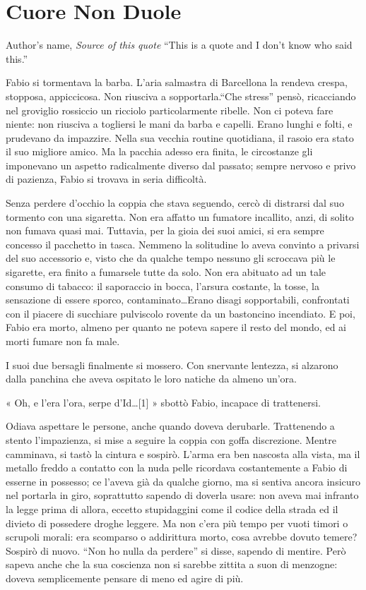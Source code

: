 \chapter{Cuore Non Duole}

\begin{chapquote}{Author's name, \textit{Source of this quote}}
``This is a quote and I don't know who said this.''
\end{chapquote}

Fabio si tormentava la barba. L'aria salmastra di Barcellona la rendeva crespa, stopposa, appiccicosa. Non riusciva a sopportarla.``Che stress'' pensò, ricacciando nel groviglio rossiccio un ricciolo particolarmente ribelle. Non ci poteva fare niente: non riusciva a togliersi le mani da barba e capelli. Erano lunghi e folti, e prudevano da impazzire. Nella sua vecchia routine quotidiana, il rasoio era stato il suo migliore amico. Ma la pacchia adesso era finita, le circostanze gli imponevano un aspetto radicalmente diverso dal passato; sempre nervoso e privo di pazienza, Fabio si trovava in seria difficoltà.

Senza perdere d'occhio la coppia che stava seguendo, cercò di distrarsi dal suo tormento con una sigaretta. Non era affatto un fumatore incallito, anzi, di solito non fumava quasi mai. Tuttavia, per la gioia dei suoi amici, si era sempre concesso il pacchetto in tasca. Nemmeno la solitudine lo aveva convinto a privarsi del suo accessorio e, visto che da qualche tempo nessuno gli scroccava più le sigarette, era finito a fumarsele tutte da solo. Non era abituato ad un tale consumo di tabacco: il saporaccio in bocca, l'arsura costante, la tosse, la sensazione di essere sporco, contaminato\ldots Erano disagi sopportabili, confrontati con il piacere di succhiare pulviscolo rovente da un bastoncino incendiato. E poi, Fabio era morto, almeno per quanto ne poteva sapere il resto del mondo, ed ai morti fumare non fa male.

I suoi due bersagli finalmente si mossero. Con snervante lentezza, si alzarono dalla panchina che aveva ospitato le loro natiche da almeno un'ora.

« Oh, e l'era l'ora, serpe d'Id\ldots [1] » sbottò Fabio, incapace di trattenersi.

Odiava aspettare le persone, anche quando doveva derubarle. Trattenendo a stento l'impazienza, si mise a seguire la coppia con goffa discrezione. Mentre camminava, si tastò la cintura e sospirò. L'arma era ben nascosta alla vista, ma il metallo freddo a contatto con la nuda pelle ricordava costantemente a Fabio di esserne in possesso; ce l'aveva già da qualche giorno, ma si sentiva ancora insicuro nel portarla in giro, soprattutto sapendo di doverla usare: non aveva mai infranto la legge prima di allora, eccetto stupidaggini come il codice della strada ed il divieto di possedere droghe leggere. Ma non c'era più tempo per vuoti timori o scrupoli morali: era scomparso o addirittura morto, cosa avrebbe dovuto temere? Sospirò di nuovo. ``Non ho nulla da perdere'' si disse, sapendo di mentire. Però sapeva anche che la sua coscienza non si sarebbe zittita a suon di menzogne: doveva semplicemente pensare di meno ed agire di più.

